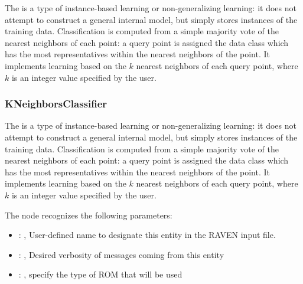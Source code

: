  The  is a type of instance-based learning or
 non-generalizing learning: it does not attempt to construct a general internal
 model, but simply stores instances of the training data.                          Classification is
 computed from a simple majority vote of the nearest neighbors                          of each
 point: a query point is assigned the data class which has the most
 representatives within the nearest neighbors of the point.                          It implements
 learning based on the $k$ nearest neighbors of each query point,                          where $k$
 is an integer value specified by the user.

\subsubsection{KNeighborsClassifier}
  The  is a type of instance-based learning or
  non-generalizing learning: it does not attempt to construct a general internal
  model, but simply stores instances of the training data.                          Classification
  is computed from a simple majority vote of the nearest neighbors                          of each
  point: a query point is assigned the data class which has the most
  representatives within the nearest neighbors of the point.                          It implements
  learning based on the $k$ nearest neighbors of each query point,                          where
  $k$ is an integer value specified by the user.

  The  node recognizes the following parameters:
    \begin{itemize}
      \item {}: , 
        User-defined name to designate this entity in the RAVEN input file.
      \item {}: , 
        Desired verbosity of messages coming from this entity
      \item {}: , 
        specify the type of ROM that will be used
  \end{itemize}

